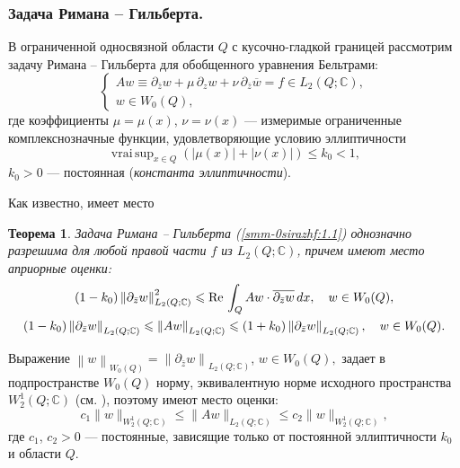 \documentclass[a4paper,12pt]{article}
\newtheorem{theorem}{Теорема}[section]
\theoremstyle{definition}
\begin{document}
\subsubsection{Задача Римана -- Гильберта.} В ограниченной односвязной области $Q$ с кусочно-гладкой границей рассмотрим задачу Римана -- Гильберта для обобщенного уравнения Бельтрами:
\begin{equation}\label{smm-0sirazhf:1.1}
	\left\{\begin{array}{l}
		A w\equiv\partial_{\bar{z}}w+\mu\,\partial_z w+\nu\,\partial_{\bar z}\overline{w}=f\in L_2(Q;\mathbb{C}), \\[3mm]
		w\in W_0(Q),
	\end{array}\right.
\end{equation}
где коэффициенты $\mu=\mu(x)$, $\nu=\nu(x)$ --- измеримые ограниченные комплекснозначные функции, удовлетворяющие условию эллиптичности
\begin{equation}\label{smm-00sirazhf:1.2}
	\mathop{vrai\,sup}_{x\in Q}\left(|\mu(x)|+|\nu(x)|\right)\leqslant k_0 <1,
\end{equation}
$k_0>0$ --- постоянная (\textit{константа эллиптичности}).

Как известно, имеет место

\begin{theorem}\label{smm2-th1}
 Задача Римана -- Гильберта {(\ref{smm-0sirazhf:1.1})} однозначно разрешима для любой правой части $f$ из $L_2(Q;\mathbb{C})$,
	причем имеют место априорные оценки:
\begin{gather}\label{smm-0sirazhf:1.3}
	(1-k_0)\left\|\partial_{\bar{z}}w\right\|^2_{L_2(Q;\mathbb{C})}\leqslant \text{Re\,} \int_{Q} Aw\cdot \overline{\partial_{\bar{z}}w}\,dx,\quad w\in W_0(Q),\\
	\label{smm-0sirazhf:1.4}
	(1-k_0)\left\|\partial_{\bar{z}}w\right\|_{L_2(Q;\mathbb{C})}\leqslant \left\| Aw\right\|_{L_2(Q;\mathbb{C})} \leqslant
	(1+k_0)\left\|\partial_{\bar{z}}w\right\|_{L_2(Q;\mathbb{C})}, \quad w\in W_0(Q).
\end{gather}
\end{theorem}
Выражение
$
\left\| w\right\|_{W_0(Q)}=\left\| \partial_{\bar{z}}w\right\|_{L_2(Q;\mathbb{C})}$, $w\in W_0(Q),
$
задает в подпространстве $W_0(Q)$ норму, эквивалентную норме исходного пространства $W_2^1(Q;\mathbb{C})$ (см.  \cite{smm-12,smm-13}),
поэтому имеют место оценки:
\begin{equation}\label{smm-0sirazhf:1.5}
	c_1\|w\|_{W^1_2(Q;\mathbb{C})}\leqslant\|Aw\|_{L_2(Q;\mathbb{C})}\leqslant c_2 \|w\|_{W^1_2(Q;\mathbb{C})},
\end{equation}
где $c_1$, $c_2>0$ --- постоянные, зависящие только от постоянной эллиптичности $k_0$ и области $Q$.
\end{document}
